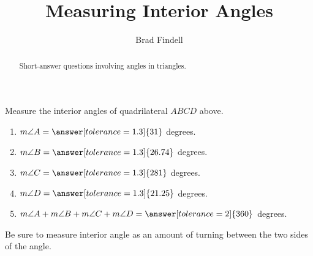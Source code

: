 \documentclass[nooutcomes]{ximera}
\title{Measuring Interior Angles}
\author{Brad Findell}
\begin{document}
\begin{abstract}
Short-answer questions involving angles in triangles.
\end{abstract}
\maketitle

\begin{center}  
\end{center}
\begin{problem}
Measure the interior angles of quadrilateral $ABCD$ above.  
\begin{enumerate}
\item $m\angle A = \answer[tolerance=1.3]{31}$ degrees.
\item $m\angle B = \answer[tolerance=1.3]{26.74}$ degrees.
\item $m\angle C = \answer[tolerance=1.3]{281}$ degrees.
\item $m\angle D = \answer[tolerance=1.3]{21.25}$ degrees.
\item $m\angle A + m\angle B + m\angle C + m\angle D = \answer[tolerance=2]{360}$ degrees.
\end{enumerate}
\begin{hint}
Be sure to measure interior angle as an amount of turning between the two sides of the angle.   
\end{hint}

\end{problem}
\end{document}
